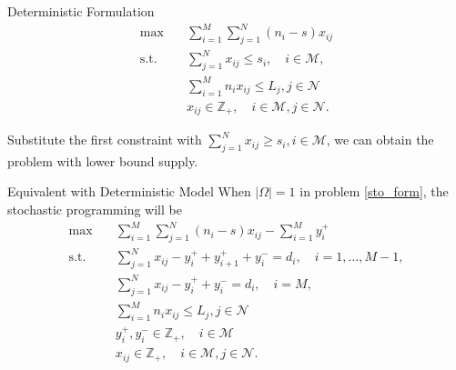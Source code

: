 \begin{frame}{Deterministic Formulation}
  \begin{equation}\label{deter_upper}
    \begin{aligned}
    \max \quad & \sum_{i=1}^{M}  \sum_{j= 1}^{N} (n_i- s) x_{ij} \\
    \text {s.t.} \quad & \sum_{j= 1}^{N} x_{ij} \leq s_{i}, \quad i \in \mathcal{M}, \\
    & \sum_{i=1}^{M} n_{i} x_{ij} \leq L_j, j \in \mathcal{N} \\
    & x_{ij} \in \mathbb{Z}_{+}, \quad i \in \mathcal{M}, j \in \mathcal{N}.
    \end{aligned}
  \end{equation}

  Substitute the first constraint with $\sum_{j= 1}^{N} x_{ij} \geq s_{i}, i \in \mathcal{M}$, we can obtain the problem with lower bound supply. \label{deter_lower}
\end{frame}

  \begin{frame}{Equivalent with Deterministic Model}
    When $|\Omega| =1$ in problem \eqref{sto_form}, the stochastic programming will be 
    \small
    \begin{equation}\label{one_form}
      \begin{aligned}
      \max \quad & \sum_{i=1}^{M}  \sum_{j= 1}^{N} (n_i-s) x_{ij} - \sum_{i=1}^{M} y_{i}^{+}  \\
      \text {s.t.} \quad & \sum_{j= 1}^{N} x_{ij} - y_{i}^{+}+ y_{i+1}^{+} + y_{i}^{-} = d_{i}, \quad i = 1,\ldots, M-1, \\
      & \sum_{j= 1}^{N} x_{ij} -y_{i}^{+} + y_{i}^{-} = d_{i}, \quad i = M, \\
      & \sum_{i=1}^{M} n_{i} x_{ij} \leq L_j, j \in \mathcal{N}\\
      & y_{i}^{+}, y_{i}^{-} \in \mathbb{Z}_{+}, \quad i \in \mathcal{M} \\
      & x_{ij} \in \mathbb{Z}_{+}, \quad i \in \mathcal{M}, j \in \mathcal{N}.
      \end{aligned}
    \end{equation}
  \end{frame}



